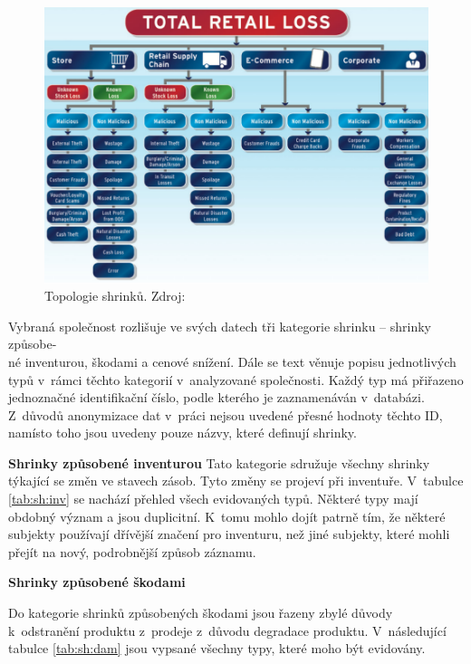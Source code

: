 \begin{figure}[hbtp!]
    \centering
    \captionsetup{justification=centering}
    \includegraphics[width=\textwidth]{obrazky/typyshirnku.png}
    \caption{Topologie shrinků. Zdroj: \cite{bib:shrink2}}
    \label{obr:shrinkytypyBeck}
\end{figure}

Vybraná společnost rozlišuje ve svých datech tři kategorie shrinku -- shrinky způsobe-\\né inventurou, škodami a cenové snížení. Dále se text věnuje popisu jednotlivých typů v~rámci těchto kategorií v~analyzované společnosti. Každý typ má přiřazeno jednoznačné identifikační číslo, podle kterého je zaznamenáván v~databázi. Z~důvodů anonymizace dat v~práci nejsou uvedené přesné hodnoty těchto ID, namísto toho jsou uvedeny pouze názvy, které definují shrinky.

\vspace*{1em}

\textbf{Shrinky způsobené inventurou}
Tato kategorie sdružuje všechny shrinky týkající se změn ve stavech zásob. Tyto změny se projeví při inventuře. V~tabulce \ref*{tab:sh:inv} se nachází přehled všech evidovaných typů. Některé typy mají obdobný význam a jsou duplicitní. K~tomu mohlo dojít patrně tím, že některé subjekty používají dřívější značení pro inventuru, než jiné subjekty, které mohli přejít na nový, podrobnější způsob záznamu. 

\vspace*{1em}

\textbf{Shrinky způsobené škodami}

Do kategorie shrinků způsobených škodami jsou řazeny zbylé důvody k~odstranění produktu z~prodeje z~důvodu degradace produktu. V~následující tabulce \ref{tab:sh:dam} jsou vypsané všechny typy, které moho být evidovány.


